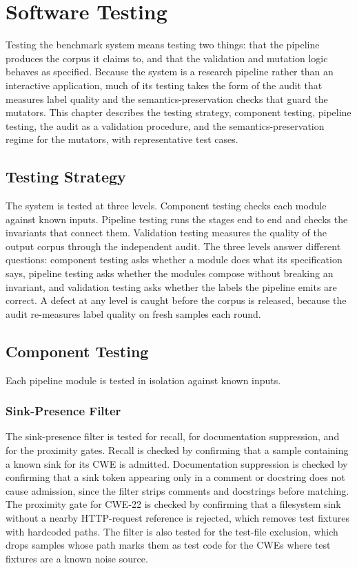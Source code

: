 \chapter{Software Testing}
\label{ch:testing}

Testing the benchmark system means testing two things: that the pipeline
produces the corpus it claims to, and that the validation and mutation logic
behaves as specified. Because the system is a research pipeline rather than an
interactive application, much of its testing takes the form of the audit that
measures label quality and the semantics-preservation checks that guard the
mutators. This chapter describes the testing strategy, component testing,
pipeline testing, the audit as a validation procedure, and the
semantics-preservation regime for the mutators, with representative test cases.


\section{Testing Strategy}

The system is tested at three levels. Component testing checks each module
against known inputs. Pipeline testing runs the stages end to end and checks the
invariants that connect them. Validation testing measures the quality of the
output corpus through the independent audit. The three levels answer different
questions: component testing asks whether a module does what its specification
says, pipeline testing asks whether the modules compose without breaking an
invariant, and validation testing asks whether the labels the pipeline emits are
correct. A defect at any level is caught before the corpus is released, because
the audit re-measures label quality on fresh samples each round.

\section{Component Testing}

Each pipeline module is tested in isolation against known inputs.

\subsection{Sink-Presence Filter}

The sink-presence filter is tested for recall, for documentation suppression,
and for the proximity gates. Recall is checked by confirming that a sample
containing a known sink for its CWE is admitted. Documentation suppression is
checked by confirming that a sink token appearing only in a comment or docstring
does not cause admission, since the filter strips comments and docstrings before
matching. The proximity gate for CWE-22 is checked by confirming that a
filesystem sink without a nearby HTTP-request reference is rejected, which
removes test fixtures with hardcoded paths. The filter is also tested for the
test-file exclusion, which drops samples whose path marks them as test code for
the CWEs where test fixtures are a known noise source.


